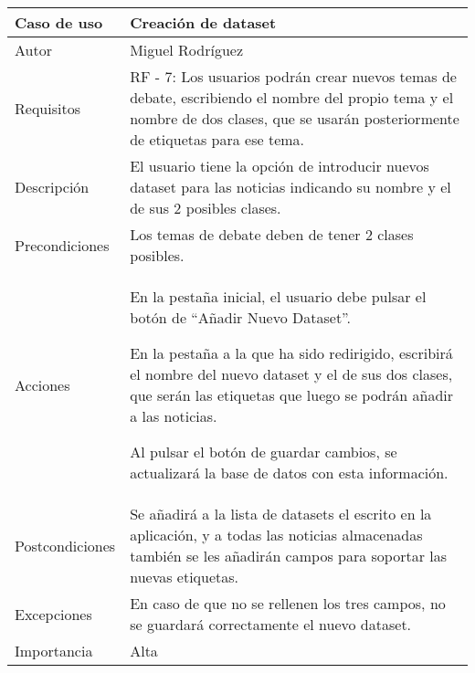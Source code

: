 \begin{center}
\begin{tabular}{ | m{3cm} | m{10cm}| } 
\hline
Caso de uso & Creación de dataset \\ 
\hline
Autor & Miguel Rodríguez \\ 
\hline
Requisitos & RF - 7: Los usuarios podrán crear nuevos temas de debate, escribiendo el nombre del propio tema y el nombre de dos clases, que se usarán posteriormente de etiquetas para ese tema. \\ 
\hline
Descripción & El usuario tiene la opción de introducir nuevos dataset para las noticias indicando su nombre y el de sus 2 posibles clases. \\
\hline
Precondiciones & Los temas de debate deben de tener 2 clases posibles. \\
\hline
Acciones & En la pestaña inicial, el usuario debe pulsar el botón de ``Añadir Nuevo Dataset''.

En la pestaña a la que ha sido redirigido, escribirá el nombre del nuevo dataset y el de sus dos clases, que serán las etiquetas que luego se podrán añadir a las noticias.

Al pulsar el botón de guardar cambios, se actualizará la base de datos con esta información. \\
\hline
Postcondiciones & Se añadirá a la lista de datasets el escrito en la aplicación, y a todas las noticias almacenadas también se les añadirán campos para soportar las nuevas etiquetas.\\
\hline
Excepciones & En caso de que no se rellenen los tres campos, no se guardará correctamente el nuevo dataset. \\
\hline 
Importancia & Alta \\
\hline 
\end{tabular}
\end{center}